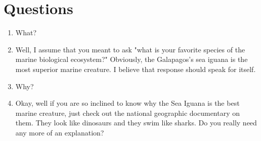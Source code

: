 \tableofcontents 
\newpage

\section{Questions}
    \begin{enumerate}
        \item What?	
        \item[] Well, I assume that you meant to ask "what is your favorite species of the marine biological ecosystem?" Obviously, the Galapagos's sea iguana is the most superior marine creature. I believe that response should speak for itself.
        \item Why?
        \item[] Okay, well if you are so inclined to know why the Sea Iguana is the best marine creature, just check out the national geographic documentary on them. They look like dinosaurs and they swim like sharks. Do you really need any more of an explanation?
    \end{enumerate}

%
%


